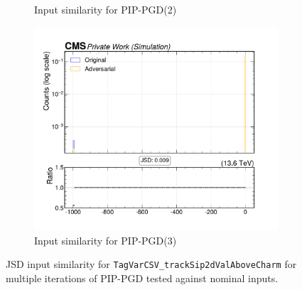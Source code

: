 \begin{figure}[htbp]
\begin{subfigure}[t]{0.32\textwidth}
    \caption*{Input similarity for PIP-PGD(2)}
  \end{subfigure}\hfill
  \begin{subfigure}[t]{0.32\textwidth}
    \includegraphics[width=\linewidth]{media/output/features/compare/combined_it_3/cmp_global_features_TagVarCSV_trackSip2dValAboveCharm.pdf}
    \caption*{Input similarity for PIP-PGD(3)}
  \end{subfigure}

  \caption*{JSD input similarity for \texttt{TagVarCSV\_trackSip2dValAboveCharm} for multiple iterations of PIP-PGD tested against nominal inputs.}
  \label{fig:combined_input_TagVarCSV_trackSip2dValAboveCharm}
\end{figure}

